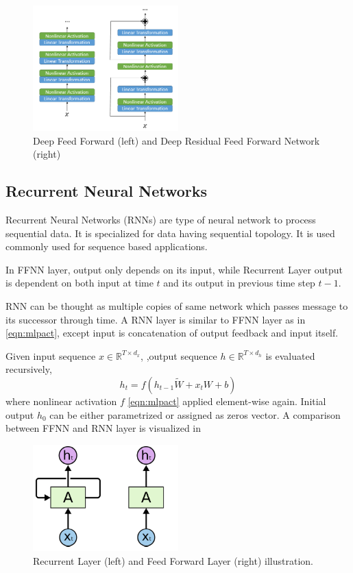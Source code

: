 \begin{figure}
	\centering
	\includegraphics[width=0.5\textwidth]{figures/ml_theory/rffnn_ffnn.png}
	\caption{Deep Feed Forward (left) and Deep Residual Feed Forward Network (right)}
	\label{fig:rffnn_ffnn}
\end{figure}

\subsection{Recurrent Neural Networks}

Recurrent Neural Networks (RNNs) \cite{rumelhart_learning_1986} are type of neural network to process sequential data. 
It is specialized for data having sequential topology. 
It is used commonly used for sequence based applications. 

In FFNN layer, output only depends on its input, while Recurrent Layer output is dependent on both input at time $t$ and its output in previous time step $t-1$. 

RNN can be thought as multiple copies of same network which passes message to its successor through time. 
A RNN layer is similar to FFNN layer as in \eqref{eqn:mlpact}, 
except input is concatenation of output feedback and input itself.

Given input sequence $x \in \mathbb{R}^{T \times d_x}$, ,output sequence $h \in \mathbb{R}^{T \times d_h}$ is evaluated recursively,  
\begin{equation}
\label{eqn:rnnact}
h_t = f (h_{t-1} \tilde{W} + x_t W + b)
\end{equation}
where nonlinear activation $f$ \ref{eqn:mlpact} applied element-wise again. Initial output $h_0$ can be either parametrized or assigned as zeros vector. A comparison between FFNN and RNN layer is visualized in 

\begin{figure}
	\centering
	\includegraphics[width=0.5\textwidth]{figures/ml_theory/rnn_vs_ffnn_layer.png}
	\caption{Recurrent Layer (left) and Feed Forward Layer (right) illustration.}
	\label{fig:rnn_vs_ffnn}
\end{figure}

